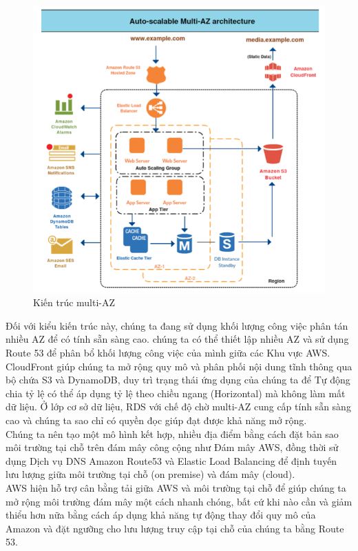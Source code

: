 \begin{itemize}
\begin{figure}[H]
            \begin{center}
            \includegraphics[scale=0.8]{images/hieu/chap-2/multi-AZ-architecture.png}
            \vspace*{5mm}
            \caption{Kiến trúc multi-AZ}
            \end{center}
        \end{figure}
        Đối với kiểu kiến trúc này, chúng ta đang sử dụng khối lượng công việc phân tán nhiều AZ để có tính sẵn sàng cao. chúng ta có thể thiết lập nhiều AZ và sử dụng Route 53 để phân bổ khối lượng công việc của mình giữa các Khu vực AWS.\\[0.5cm]
        CloudFront giúp chúng ta mở rộng quy mô và phân phối nội dung tĩnh thông qua bộ chứa S3 và DynamoDB, duy trì trạng thái ứng dụng của chúng ta để Tự động chia tỷ lệ có thể áp dụng tỷ lệ theo chiều ngang (Horizontal) mà không làm mất dữ liệu. Ở lớp cơ sở dữ liệu, RDS với chế độ chờ multi-AZ cung cấp tính sẵn sàng cao và chúng ta sao chỉ có quyền đọc giúp đạt được khả năng mở rộng.\\[0.5cm]
        Chúng ta nên tạo một mô hình kết hợp, nhiều địa điểm bằng cách đặt bản sao môi trường tại chỗ trên đám mây công cộng như Đám mây AWS, đồng thời sử dụng Dịch vụ DNS Amazon Route53 và 
        Elastic Load Balancing để định tuyến lưu lượng giữa môi trường tại chỗ (on premise) và đám mây (cloud).\\[0.5cm]
        AWS hiện hỗ trợ cân bằng tải giữa AWS và môi trường tại chỗ để giúp chúng ta mở rộng môi trường đám mây một cách nhanh chóng, bất cứ khi nào cần và giảm thiểu hơn nữa bằng cách áp dụng khả năng tự động thay đổi quy mô của Amazon và đặt ngưỡng cho lưu lượng truy cập tại chỗ của chúng ta bằng Route 53.
    \end{itemize}
